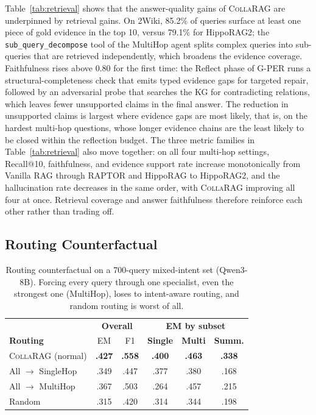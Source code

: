 \documentclass[11pt,a4paper]{article}
\newcommand{\sys}{\textsc{CollaRAG}}
\newcommand{\best}[1]{\textbf{#1}}
\begin{document}
Table~\ref{tab:retrieval} shows that the answer-quality gains of \sys{} are underpinned by retrieval gains.
On 2Wiki, 85.2\% of queries surface at least one piece of gold evidence in the top 10, versus 79.1\% for HippoRAG2; the \texttt{sub\_query\_decompose} tool of the MultiHop agent splits complex queries into sub-queries that are retrieved independently, which broadens the evidence coverage.
Faithfulness rises above 0.80 for the first time: the Reflect phase of G-PER runs a structural-completeness check that emits typed evidence gaps for targeted repair, followed by an adversarial probe that searches the KG for contradicting relations, which leaves fewer unsupported claims in the final answer.
The reduction in unsupported claims is largest where evidence gaps are most likely, that is, on the hardest multi-hop questions, whose longer evidence chains are the least likely to be closed within the reflection budget.
The three metric families in Table~\ref{tab:retrieval} also move together: on all four multi-hop settings, Recall@10, faithfulness, and evidence support rate increase monotonically from Vanilla RAG through RAPTOR and HippoRAG to HippoRAG2, and the hallucination rate decreases in the same order, with \sys{} improving all four at once.
Retrieval coverage and answer faithfulness therefore reinforce each other rather than trading off.

\subsection{Routing Counterfactual}
\label{sec:analysis:routing}

\begin{table}[t]
\centering
\small
\setlength{\tabcolsep}{4pt}
\begin{tabular}{@{}l|cc|ccc@{}}
\toprule
& \multicolumn{2}{c|}{\textbf{Overall}} & \multicolumn{3}{c}{\textbf{EM by subset}} \\
\textbf{Routing} & EM & F1 & \textbf{Single} & \textbf{Multi} & \textbf{Summ.} \\
\midrule
\sys{} (normal)      & \best{.427} & \best{.558} & \best{.400} & \best{.463} & \best{.338} \\
All $\to$ SingleHop  & .349 & .447 & .377 & .380 & .168 \\
All $\to$ MultiHop   & .367 & .503 & .264 & .457 & .215 \\
Random               & .315 & .420 & .314 & .344 & .198 \\
\bottomrule
\end{tabular}
\caption{Routing counterfactual on a 700-query mixed-intent set (Qwen3-8B). Forcing every query through one specialist, even the strongest one (MultiHop), loses to intent-aware routing, and random routing is worst of all.}
\label{tab:routing}
\end{table}
\end{document}
